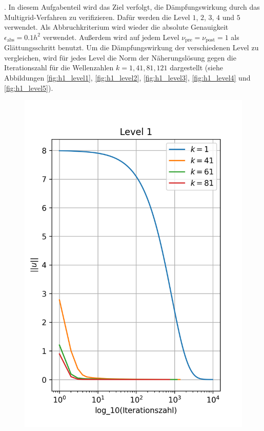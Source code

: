 \documentclass[11pt,a4paper]{article}
\begin{document}
. In diesem Aufgabenteil wird das Ziel verfolgt, die Dämpfungswirkung durch das Multigrid-Verfahren zu verifizieren. Dafür werden die Level $1$, $2$, $3$, $4$ und $5$ verwendet. Als Abbruchkriterium wird wieder die absolute Genauigkeit $\epsilon_{\mathrm{abs}} = 0.1 h^2$ verwendet.
Außerdem wird auf jedem Level $\nu_{\mathrm{pre}} = \nu_{\mathrm{post}} = 1$ als Glättungsschritt benutzt. Um die Dämpfungswirkung der verschiedenen Level zu vergleichen, wird für jedes Level die Norm der Näherungslösung gegen die Iterationszahl für die Wellenzahlen $k = 1, 41, 81, 121$ dargestellt
(siehe Abbildungen \ref{fig:h1_level1}, \ref{fig:h1_level2}, \ref{fig:h1_level3}, \ref{fig:h1_level4} und \ref{fig:h1_level5}).
\begin{figure}[htbp]
    \centering
    \begin{minipage}{0.45\linewidth}
        \centering
        \includegraphics[width= \linewidth,scale=0.7]{h1_level1}

\end{minipage}
\end{figure}
\end{document}
